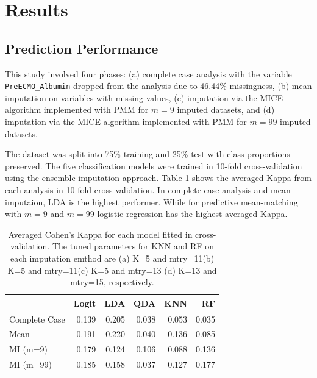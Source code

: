 \documentclass[12pt,]{article}
\begin{document}
\newpage

\section{Results}\label{results}

\subsection{Prediction Performance}\label{prediction-performance}

This study involved four phases: (a) complete case analysis with the
variable \texttt{PreECMO\_Albumin} dropped from the analysis due to
46.44\% missingness, (b) mean imputation on variables with missing
values, (c) imputation via the MICE algorithm implemented with PMM for
\(m=9\) imputed datasets, and (d) imputation via the MICE algorithm
implemented with PMM for \(m=99\) imputed datasets.

The dataset was split into 75\% training and 25\% test with class
proportions preserved. The five classification models were trained in
10-fold cross-validation using the ensemble imputation approach. Table
\ref{tab:cv-kappa} shows the averaged Kappa from each analysis in
10-fold cross-validation. In complete case analysis and mean imputaion,
LDA is the highest performer. While for predictive mean-matching with
\(m=9\) and \(m=99\) logistic regression has the highest averaged Kappa.

\begin{table}[!h]

\caption{\label{tab:unnamed-chunk-8}\label{tab:cv-kappa} Averaged Cohen's Kappa for each model fitted in cross-validation.  The tuned parameters for KNN and RF on each imputation emthod are (a) K=5 and mtry=11(b) K=5 and mtry=11(c) K=5 and mtry=13 (d) K=13 and mtry=15, respectively.}
\centering
\fontsize{10}{12}\selectfont
\begin{tabular}{lrrrrr}
\toprule
  & Logit & LDA & QDA & KNN & RF\\
\midrule
Complete Case & 0.139 & 0.205 & 0.038 & 0.053 & 0.035\\
Mean & 0.191 & 0.220 & 0.040 & 0.136 & 0.085\\
MI (m=9) & 0.179 & 0.124 & 0.106 & 0.088 & 0.136\\
MI (m=99) & 0.185 & 0.158 & 0.037 & 0.127 & 0.177\\
\bottomrule
\end{tabular}
\end{table}
\end{document}
